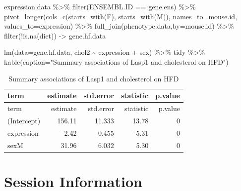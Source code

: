\documentclass[
]{article}
\newenvironment{Shaded}{\begin{snugshade}}{\end{snugshade}}
\newcommand{\AttributeTok}[1]{\textcolor[rgb]{0.77,0.63,0.00}{#1}}
\newcommand{\FunctionTok}[1]{\textcolor[rgb]{0.00,0.00,0.00}{#1}}
\newcommand{\NormalTok}[1]{#1}
\newcommand{\OtherTok}[1]{\textcolor[rgb]{0.56,0.35,0.01}{#1}}
\newcommand{\SpecialCharTok}[1]{\textcolor[rgb]{0.00,0.00,0.00}{#1}}
\newcommand{\StringTok}[1]{\textcolor[rgb]{0.31,0.60,0.02}{#1}}
\begin{document}
\begin{Shaded}
\begin{Highlighting}[]
\NormalTok{expression.data }\SpecialCharTok{\%\textgreater{}\%}
  \FunctionTok{filter}\NormalTok{(ENSEMBL.ID }\SpecialCharTok{==}\NormalTok{ gene.ens) }\SpecialCharTok{\%\textgreater{}\%}
  \FunctionTok{pivot\_longer}\NormalTok{(}\AttributeTok{cols=}\FunctionTok{c}\NormalTok{(}\FunctionTok{starts\_with}\NormalTok{(}\StringTok{\textquotesingle{}F\textquotesingle{}}\NormalTok{),}
                      \FunctionTok{starts\_with}\NormalTok{(}\StringTok{\textquotesingle{}M\textquotesingle{}}\NormalTok{)),}
               \AttributeTok{names\_to=}\StringTok{\textquotesingle{}mouse.id\textquotesingle{}}\NormalTok{,}
               \AttributeTok{values\_to=}\StringTok{\textquotesingle{}expression\textquotesingle{}}\NormalTok{) }\SpecialCharTok{\%\textgreater{}\%}
  \FunctionTok{full\_join}\NormalTok{(phenotype.data,}\AttributeTok{by=}\StringTok{\textquotesingle{}mouse.id\textquotesingle{}}\NormalTok{) }\SpecialCharTok{\%\textgreater{}\%}
  \FunctionTok{filter}\NormalTok{(}\SpecialCharTok{!}\FunctionTok{is.na}\NormalTok{(diet)) }\OtherTok{{-}\textgreater{}}\NormalTok{ gene.hf.data}

\FunctionTok{lm}\NormalTok{(}\AttributeTok{data=}\NormalTok{gene.hf.data, chol2 }\SpecialCharTok{\textasciitilde{}}\NormalTok{ expression }\SpecialCharTok{+}\NormalTok{ sex) }\SpecialCharTok{\%\textgreater{}\%}
\NormalTok{  tidy }\SpecialCharTok{\%\textgreater{}\%}
  \FunctionTok{kable}\NormalTok{(}\AttributeTok{caption=}\StringTok{"Summary associations of Lasp1 and cholesterol on HFD"}\NormalTok{)}
\end{Highlighting}
\end{Shaded}

\begin{longtable}[]{@{}lrrrr@{}}
\caption{Summary associations of Lasp1 and cholesterol on
HFD}\tabularnewline
\toprule()
term & estimate & std.error & statistic & p.value \\
\midrule()
\endfirsthead
\toprule()
term & estimate & std.error & statistic & p.value \\
\midrule()
\endhead
(Intercept) & 156.11 & 11.333 & 13.78 & 0 \\
expression & -2.42 & 0.455 & -5.31 & 0 \\
sexM & 31.96 & 6.032 & 5.30 & 0 \\
\bottomrule()
\end{longtable}

\hypertarget{session-information}{%
\section{Session Information}\label{session-information}}
\end{document}
